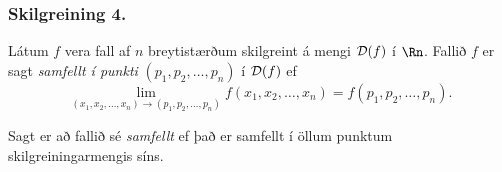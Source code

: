  \subsubsection{Skilgreining 4.}
   Látum $f$ vera fall af $n$ breytistærðum skilgreint á mengi ${\cal D}(f)$ í $\Rn$.  Fallið $f$ er sagt {\em samfellt í punkti} $ (p_1,p_2,\ldots,p_n)$ í ${\cal D}(f)$  ef 
$$\lim_{(x_1,x_2,\ldots,x_n)\rightarrow (p_1,p_2,\ldots,p_n)}
f(x_1,x_2,\ldots,x_n)=f(p_1,p_2,\ldots,p_n).$$

Sagt er að fallið sé {\em samfellt} ef það er samfellt í öllum punktum skilgreiningarmengis síns.

 






